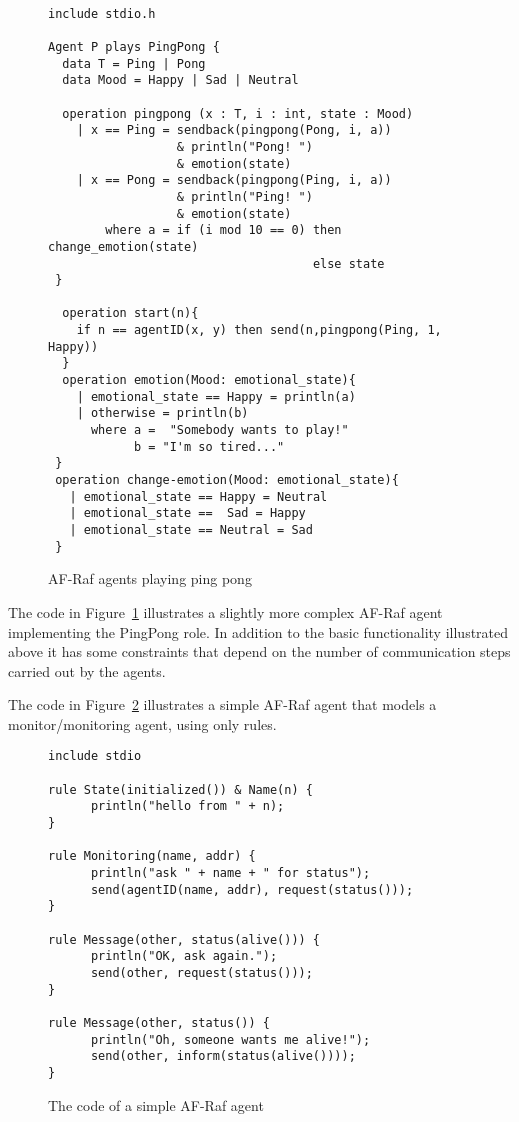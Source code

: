 \documentclass[a4paper,12pt,oneside,fleqn]{book} %
\theoremstyle{plain}
\theoremstyle{definition}
\theoremstyle{remark}
\newcommand{\rg}[1]{\marginpar{\tiny\raggedright\textcolor{blue}{\bf rg:} #1}}
\begin{document}
\rg{It's ${\it value}:{\it type}$, not ${\it type}:{\it value}$.}
\begin{figure}\footnotesize %
\begin{verbatim}

include stdio.h

Agent P plays PingPong {
  data T = Ping | Pong
  data Mood = Happy | Sad | Neutral

  operation pingpong (x : T, i : int, state : Mood)
    | x == Ping = sendback(pingpong(Pong, i, a))
                  & println("Pong! ")
                  & emotion(state)
    | x == Pong = sendback(pingpong(Ping, i, a))
                  & println("Ping! ")
                  & emotion(state)
        where a = if (i mod 10 == 0) then change_emotion(state)
                                     else state
 }

  operation start(n){
    if n == agentID(x, y) then send(n,pingpong(Ping, 1, Happy))
  }
  operation emotion(Mood: emotional_state){
    | emotional_state == Happy = println(a)
    | otherwise = println(b)
      where a =  "Somebody wants to play!"
            b = "I'm so tired..."
 }
 operation change-emotion(Mood: emotional_state){
   | emotional_state == Happy = Neutral
   | emotional_state ==  Sad = Happy
   | emotional_state == Neutral = Sad
 }
\end{verbatim}
\caption{AF-Raf agents playing ping pong}
\label{fig:AF-Raf-constraint-pingpong}
\end{figure} %

The code in Figure~\ref{fig:AF-Raf-constraint-pingpong} illustrates a
slightly more complex AF-Raf agent implementing the PingPong role. In
addition to the basic functionality illustrated above it has some
constraints that depend on the number of communication steps carried out by
the agents.


The code in Figure~\ref{fig:AF-Raf-no-roles} illustrates a simple AF-Raf
agent that models a monitor/monitoring agent, using only rules.

\begin{figure}\footnotesize %
\begin{verbatim}
include stdio

rule State(initialized()) & Name(n) {
      println("hello from " + n);
}

rule Monitoring(name, addr) {
      println("ask " + name + " for status");
      send(agentID(name, addr), request(status()));
}

rule Message(other, status(alive())) {
      println("OK, ask again.");
      send(other, request(status()));
}

rule Message(other, status()) {
      println("Oh, someone wants me alive!");
      send(other, inform(status(alive())));
}
\end{verbatim}
\caption{The code of a simple AF-Raf agent}
\label{fig:AF-Raf-no-roles}
\end{figure} %
\end{document}
